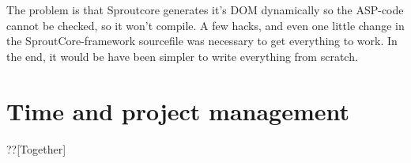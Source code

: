 \documentclass[a4paper,titlepage]{article}
\begin{document}
The problem is that Sproutcore generates it's DOM dynamically so the ASP-code cannot be checked, so it won't compile. A few hacks, and even one little change in the SproutCore-framework sourcefile was necessary to get everything to work. In the end, it would be have been simpler to write everything from scratch. 

\section{Time and project management}
??[Together]
\nocite{*}


\end{document}
